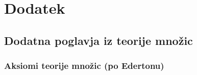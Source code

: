 \documentclass[11pt,paper=b5,footinclude,headinclude]{scrbook} %
\def\sledi {{~\Rightarrow~}}
\begin{document}
%
%
%
%
%
%
%
%
%
%
%
%
%
%




\appendix
\cleardoublepage\part*{Dodatek}
\chapter{Dodatna poglavja iz teorije množic}


\section{Aksiomi teorije množic (po Edertonu)}
\end{document}
